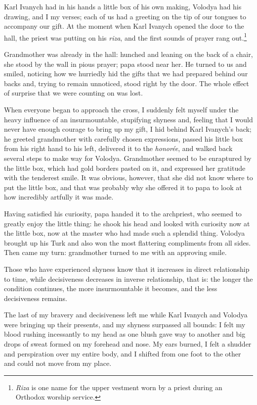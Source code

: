 Karl Ivanych had in his hands a little box of his own making, Volodya had his drawing, and I my verses; each of us had a greeting on the tip of our tongues to accompany our gift. At the moment when Karl Ivanych opened the door to the hall, the priest was putting on his \textit{riza}, and the first sounds of prayer rang out.\footnote{\textit{Riza} is one name for the upper vestment worn by a priest during an Orthodox worship service.}

Grandmother was already in the hall: hunched and leaning on the back of a chair, she stood by the wall in pious prayer; papa stood near her. He turned to us and smiled, noticing how we hurriedly hid the gifts that we had prepared behind our backs and, trying to remain unnoticed, stood right by the door. The whole effect of surprise that we were counting on was lost.

When everyone began to approach the cross, I suddenly felt myself under the heavy influence of an insurmountable, stupifying shyness and, feeling that I would never have enough courage to bring up my gift, I hid behind Karl Ivanych's back; he greeted grandmother with carefully chosen expressions, passed his little box from his right hand to his left, delivered it to the \textit{honor\'ee}, and walked back several steps to make way for Volodya. Grandmother seemed to be enraptured by the little box, which had gold borders pasted on it, and expressed her gratitude with the tenderest smile. It was obvious, however, that she did not know where to put the little box, and that was probably why she offered it to papa to look at how incredibly artfully it was made.

Having satisfied his curiosity, papa handed it to the archpriest, who seemed to greatly enjoy the little thing: he shook his head and looked with curiosity now at the little box, now at the master who had made such a splendid thing. Volodya brought up his Turk and also won the most flattering compliments from all sides. Then came my turn: grandmother turned to me with an approving smile.

Those who have experienced shyness know that it increases in direct relationship to time, while decisiveness decreases in inverse relationship, that is: the longer the condition continues, the more insurmountable it becomes, and the less decisiveness remains.

The last of my bravery and decisiveness left me while Karl Ivanych and Volodya were bringing up their presents, and my shyness surpassed all bounds: I felt my blood rushing incessantly to my head as one blush gave way to another and big drops of sweat formed on my forehead and nose. My ears burned, I felt a shudder and perspiration over my entire body, and I shifted from one foot to the other and could not move from my place.

